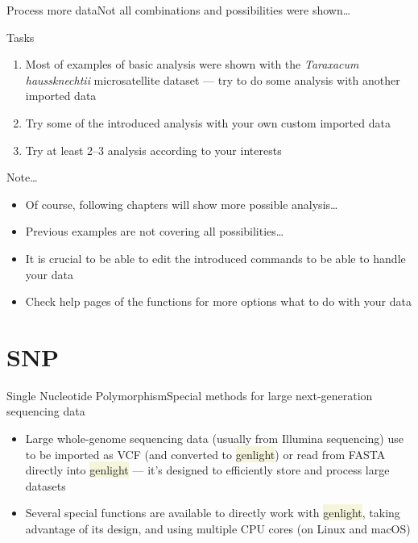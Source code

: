 \documentclass[compress, xelatex, 11pt, xcolor=svgnames, aspectratio=169, url={hyphens, lowtilde}]{beamer}
\renewcommand{\texttt}[1]{\colorbox{Beige}{{\ttfamily #1}}}
\begin{document}
\begin{frame}{Process more data}{Not all combinations and possibilities were shown\ldots}
	\begin{exampleblock}{Tasks}
		\begin{enumerate}
			\item Most of examples of basic analysis were shown with the \textit{Taraxacum haussknechtii} microsatellite dataset --- try to do some analysis with another imported data
			\item Try some of the introduced analysis with your own custom imported data
			\item Try at least 2--3 analysis according to your interests
		\end{enumerate}
	\end{exampleblock}
	\begin{block}{Note\ldots}
		\begin{itemize}
			\item Of course, following chapters will show more possible analysis\ldots
			\item Previous examples are not covering all possibilities\ldots
			\item It is crucial to be able to edit the introduced commands to be able to handle your data
			\item Check help pages of the functions for more options what to do with your data
		\end{itemize}
	\end{block}
\end{frame}

\section{SNP}

\begin{frame}{Single Nucleotide Polymorphism}{Special methods for large next-generation sequencing data}
	\tableofcontents[currentsection, sectionstyle=show/hide, hideothersubsections]
	\begin{itemize}
		\item Large whole-genome sequencing data (usually from Illumina sequencing) use to be imported as VCF (and converted to \texttt{genlight}) or read from FASTA directly into \texttt{genlight} --- it's designed to efficiently store and process large datasets
		\item Several special functions are available to directly work with \texttt{genlight}, taking advantage of its design, and using multiple CPU cores (on Linux and macOS)
	\end{itemize}
\end{frame}
\end{document}
